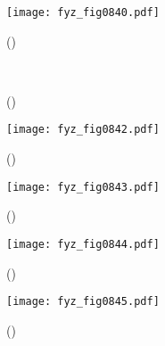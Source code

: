     \begin{figure}[ht!] %
      \centering
      \texttt{[image: fyz\_fig0840.pdf]}
      \caption{
               (\cite[s.~707]{Feynman02})}
      \label{fyz:fig0840}
    \end{figure}
    
    \begin{figure}[ht!] %
      \centering
                     \\
      \caption{
               (\cite[s.~748]{Feynman02})}
      \label{fyz:fig0841}
    \end{figure}

    \begin{figure}[ht!] %
      \centering
      \texttt{[image: fyz\_fig0842.pdf]}
      \caption{
               (\cite[s.~707]{Feynman02})}
      \label{fyz:fig0842}
    \end{figure}

    \begin{figure}[ht!] %
      \centering
      \texttt{[image: fyz\_fig0843.pdf]}
      \caption{
               (\cite[s.~707]{Feynman02})}
      \label{fyz:fig0843}
    \end{figure}

    \begin{figure}[ht!] %
      \centering
      \texttt{[image: fyz\_fig0844.pdf]}
      \caption{
               (\cite[s.~707]{Feynman02})}
      \label{fyz:fig0844}
    \end{figure}

    \begin{figure}[ht!] %
      \centering
      \texttt{[image: fyz\_fig0845.pdf]}
      \caption{
               (\cite[s.~707]{Feynman02})}
      \label{fyz:fig0845}
    \end{figure}

